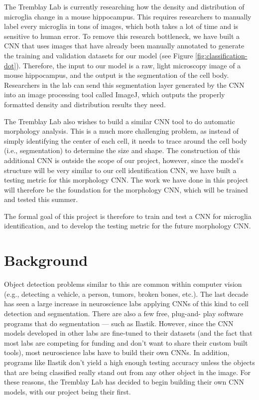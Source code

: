 \documentclass{article}
\begin{document}
The Tremblay Lab is currently researching how the density and distribution of 
microglia change in a mouse hippocampus. This requires researchers to 
manually label every microglia in tons of images, which both takes a lot of 
time and is sensitive to human error. To remove this research bottleneck, we 
have built a CNN that uses images that have already been manually annotated 
to generate the training and validation datasets for our model (see Figure 
\ref{fig:classification-dot}). Therefore, the input to our model is a raw, 
light microscopy image of a mouse hippocampus, and the output is the 
segmentation of the cell body.  Researchers in the lab can send this 
segmentation layer generated by the CNN into an image processing tool called 
ImageJ, which outputs the properly formatted density and distribution results 
they need.

The Tremblay Lab also wishes to build a similar CNN tool to do automatic 
morphology analysis. This is a much more challenging problem, as instead of 
simply identifying the center of each cell, it needs to trace around the cell 
body (i.e., segmentation) to determine the size and shape. The construction 
of this additional CNN is outside the scope of our project, however, since 
the model’s structure will be very similar to our cell identification CNN, we 
have built a testing metric for this morphology CNN. The work we have done in 
this project will therefore be the foundation for the morphology CNN, which 
will be trained and tested this summer. 

The formal goal of this project is therefore to train and test a CNN for 
microglia identification, and to develop the testing metric for the future 
morphology CNN.

\section{Background}

Object detection problems similar to this are common within computer vision 
(e.g., detecting a vehicle, a person, tumors, broken bones, etc.). The last 
decade has seen a large increase in neuroscience labs applying CNNs of this 
kind to cell detection and segmentation. There are also a few free, plug-and-
play software programs that do segmentation — such as Ilastik\parencite{ilastik}.
However, since the CNN models developed in other labs are fine-tuned to their 
datasets (and the fact that most labs are competing for funding and don't 
want to share their custom built tools), most neuroscience labs have to build 
their own CNNs. In addition, programs like Ilastik don’t yield a high enough 
testing accuracy unless the objects that are being classified really stand 
out from any other object in the image. For these reasons, the Tremblay Lab 
has decided to begin building their own CNN models, with our project being 
their first.
\end{document}
